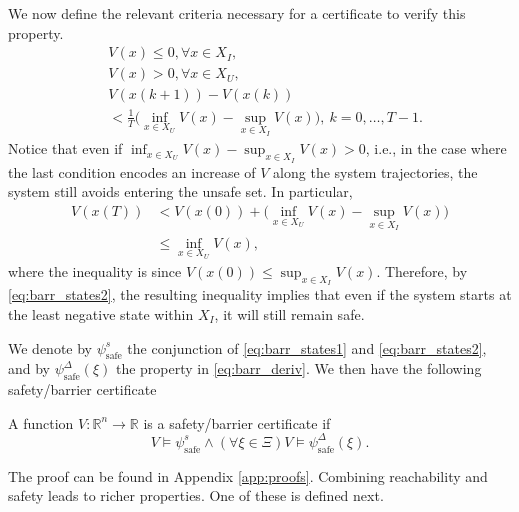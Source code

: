 We now define the relevant criteria necessary for a certificate to verify this property.
\begin{align}
	\label{eq:barr_states1}
    &V(x) \leq 0 , \forall x \in X_I,\\
	\label{eq:barr_states2}
    &V(x) > 0, \forall x \in X_U,\\
        &V(x(k+1))-V(x(k)) \label{eq:barr_deriv} \\ &<\frac{1}{T} \Big (\inf_{x \in X_U}V(x)-\sup_{x \in X_I}V(x) \Big),~ k=0,\dots,T-1. \nonumber
\end{align}
Notice that even if $\inf_{x \in X_U}V(x)-\sup_{x \in X_I}V(x) > 0$, i.e., in the case where the last condition encodes an increase of $V$ along the system trajectories, the system still avoids entering the unsafe set. In particular,
\begin{align}
V(x(T)) &< V(x(0)) + \Big (\inf_{x \in X_U}V(x)-\sup_{x \in X_I}V(x) \Big) \nonumber \\
&\leq \inf_{x \in X_U}V(x),
\end{align}
where the inequality is since $V(x(0)) \leq \sup_{x \in X_I} V(x)$.
Therefore, by \eqref{eq:barr_states2}, the resulting inequality implies that even if the system starts at the least negative state within $X_I$, it will still remain safe.

We denote by $\psi_\text{safe}^s$ the conjunction of \eqref{eq:barr_states1} and \eqref{eq:barr_states2}, and by $\psi^\Delta_\text{safe}(\xi)$ the property in \eqref{eq:barr_deriv}. We then have the following safety/barrier certificate

\begin{prop}
\label{cert:barr}
    A function $V \colon \mathbb{R}^n \rightarrow \mathbb{R}$ is a safety/barrier certificate if
	 \begin{equation}
	     V \models \psi^s_\mathrm{safe} \wedge (\forall \xi \in \Xi) V\models\psi^\Delta_\mathrm{safe}(\xi).
	 \end{equation}
\end{prop}
The proof can be found in Appendix \ref{app:proofs}.
Combining reachability and safety leads to richer properties. One of these is defined next. 

